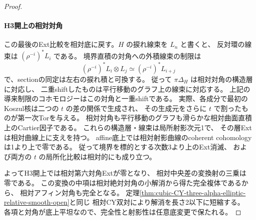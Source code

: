 \begin{proof}
\paragraph{H3開上の相対対角}
この最後のExt比較を相対底に戻す。$H$ の捩れ線束を $L_n$ と書くと、
反対環の線束は $(\rho^{-i})^*L_i$ である。
境界直積の対角への外積線束の制限は
\[
 (\rho^{-i})^*L_i\otimes L_j\simeq (\rho^{-i})^*L_{i+j}
\]
で、sectionの同定は左右の捩れ積と可換する。
従って $\pi\Delta_H$ は相対対角の構造層に対応し、
二重shiftしたものは平行移動のグラフ上の線束に対応する。
上記の導来制限のコホモロジーはこの対角と一重shiftである。
実際、各成分で最初のKoszul核は二つの $t$ の差の関係で生成され、
その生成元をさらに $t$ で割ったものが第一次Torを与える。
相対対角も平行移動のグラフも滑らかな相対曲面直積上のCartier因子である。
これらの構造層・線束は局所射影次元1で、
その層Extは相対曲線上に支えを持つ。
affine底上では相対射影曲線のcoherent cohomologyは1より上で零である。
従って境界を標的とする次数3より上のExt消滅、
および両方の $t$ の局所化比較は相対的にも成り立つ。

よってH3開上では相対第六対角Extが零となり、
相対中央差の変換射の三乗は零である。
この変換の中項は相対絶対対角の小解消から得た完全複体であるから、
相対アフィン対角も完全となる。
定理\ref{thm:cubic-CY-three-alpha-elliptic-relative-smooth-open}と同じ
相対CY双対により解消を長さ2以下に短縮する。
各項と対角が底上平坦なので、完全性と射影性は任意底変更で保たれる。
\end{proof}
